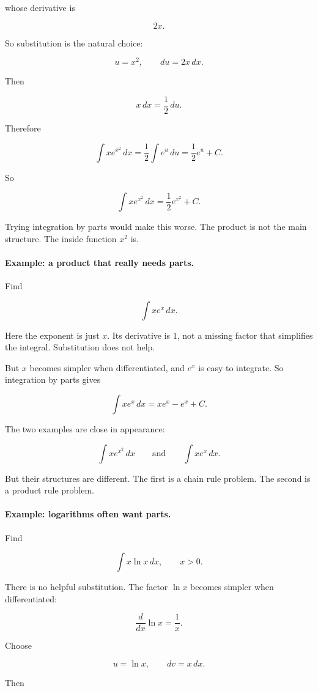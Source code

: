 whose derivative is

\[
2x.
\]

So substitution is the natural choice:

\[
u=x^2,
\qquad
du=2x\,dx.
\]

Then

\[
x\,dx=\frac12\,du.
\]

Therefore

\[
\int x e^{x^2}\,dx
=
\frac12\int e^u\,du
=
\frac12 e^u+C.
\]

So

\[
\boxed{
\int x e^{x^2}\,dx
=
\frac12 e^{x^2}+C.
}
\]

Trying integration by parts would make this worse.  The product is not the main
structure.  The inside function \(x^2\) is.

\paragraph{Example: a product that really needs parts.}
Find

\[
\int x e^x\,dx.
\]

Here the exponent is just \(x\).  Its derivative is \(1\), not a missing factor that simplifies
the integral.  Substitution does not help.

But \(x\) becomes simpler when differentiated, and \(e^x\) is easy to integrate.  So
integration by parts gives

\[
\int x e^x\,dx=xe^x-e^x+C.
\]

The two examples are close in appearance:

\[
\int x e^{x^2}\,dx
\qquad\text{and}\qquad
\int x e^x\,dx.
\]

But their structures are different.  The first is a chain rule problem.  The second is a
product rule problem.

\paragraph{Example: logarithms often want parts.}
Find

\[
\int x\ln x\,dx,
\qquad x>0.
\]

There is no helpful substitution.  The factor \(\ln x\) becomes simpler when
differentiated:

\[
\frac{d}{dx}\ln x=\frac1x.
\]

Choose

\[
u=\ln x,
\qquad
dv=x\,dx.
\]

Then


